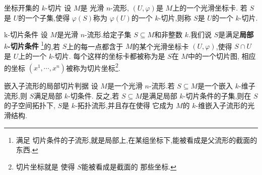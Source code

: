 \documentclass[../../几何与拓扑.tex]{subfiles}
\begin{document}

\begin{definition}{坐标开集\footnotemark 的 \(  k  \)-切片 }
    设 \(  M  \)是 光滑 \(  n  \)-流形, \(  \left( U, \varphi  \right)   \)是 \(  M  \)上的一个光滑坐标卡.
    若 \(  S  \)是 \(  U  \)的一个子集,使得 \(   \varphi \left( S \right)   \)称为 \(   \varphi \left( U \right)   \)的一个 \(  k  \)-切片,则称 \(  S  \)是 \(  U  \)的一个 \(  k  \)-切片.            
\end{definition}

\begin{definition}{k-切片条件}
    设 \(  M  \)是光滑 \(  n  \)-流形.给定子集 \(  S\subseteq M  \)和非整数 \(  k  \).我们说 \(  S  \)是满足\textbf{局部 \(  k  \)-切片条件 }\footnote{满足 切片条件的子流形,就是局部上,在某组坐标下,能被看成是父流形的截面的东西.}的,若 \(  S  \)上的每一点都含于
     \(  M  \)的某个光滑坐标卡 \(  \left( U, \varphi  \right)   \),使得 \(  S\cap U  \)是 \(  U  \)上的一个 \(  k  \)-切片.         每个这样的坐标卡都被称为是 \(  S  \)在 \(  M  \)中的一个切片图,   
     相应的坐标 \(  \left(  x^1,\cdots,x^n  \right)   \)被称为切片坐标\footnote{切片坐标就是 使得 \(  S  \)能被看成是截面的 那些坐标.}.  
\end{definition}



\begin{theorem}{嵌入子流形的局部切片判据}
    设 \(  M  \)是一个光滑 \(  n  \)-流形.若 \(  S\subseteq M  \)是一个嵌入 \(  k  \)-维子流形,则 \(  S  \)满足局部 \(  k  \)-切条件.
    反之,若 \(  S\subseteq M  \)是满足局部 \(  k  \)-切片条件的子集,则在 \(  S  \)的子空间拓扑下, \(  S  \)是 \(  k  \)-拓扑流形,并且存在使得 它成为 \(  M  \)的 \(  k  \)-维嵌入子流形的光滑结构.       
\end{theorem} 
\end{document}
